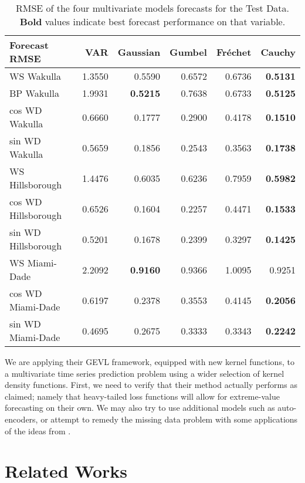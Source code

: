 \documentclass[conference]{IEEEtran}
\begin{document}
\begin{table}[t]
        \centering
        \begin{tabular}{lrrrrr}
\hline
                        Forecast RMSE & VAR &  Gaussian &  Gumbel &  Fr\'echet &  Cauchy \\
\hline
                 WS Wakulla &  1.3550  & 0.5590 & 0.6572 & 0.6736 & \textbf{0.5131} \\
BP Wakulla &  1.9931 & \textbf{0.5215} & 0.7638 & 0.6733 & \textbf{0.5125} \\
       cos WD Wakulla &  0.6660 & 0.1777 & 0.2900 & 0.4178 & \textbf{0.1510} \\
       sin WD Wakulla &   0.5659 & 0.1856 & 0.2543 & 0.3563 & \textbf{0.1738} \\
    WS Hillsborough & 1.4476  & 0.6035 & 0.6236 & 0.7959 & \textbf{0.5982} \\
  cos WD Hillsborough &   0.6526 & 0.1604 & 0.2257 & 0.4471 & \textbf{0.1533} \\
  sin WD Hillsborough &   0.5201 & 0.1678 & 0.2399 & 0.3297 & \textbf{0.1425} \\
           WS Miami-Dade &   2.2092 & \textbf{0.9160} & 0.9366 & 1.0095 & 0.9251 \\
         cos WD Miami-Dade &  0.6197 & 0.2378 & 0.3553 & 0.4145 & \textbf{0.2056} \\
         sin WD Miami-Dade & 0.4695 & 0.2675 & 0.3333 & 0.3343 & \textbf{0.2242} \\
\hline
\end{tabular}
        \caption{RMSE of the four multivariate models forecasts for the Test Data. \textbf{Bold} values indicate best forecast performance on that variable.}
        \label{tab:forecast-res-rmse}
    \end{table}

We are applying their GEVL framework, equipped with new kernel functions, to a multivariate time series prediction problem using a wider selection of kernel density functions. First, we need to verify that their method actually performs as claimed; namely that heavy-tailed loss functions will allow for extreme-value forecasting on their own. We may also try to use additional models such as auto-encoders, or attempt to remedy the missing data problem with some applications of the ideas from \cite{cheRecurrentNeuralNetworks2018, tanDATAGRUDualAttentionTimeAware2020}.

\section{Related Works}
\end{document}
